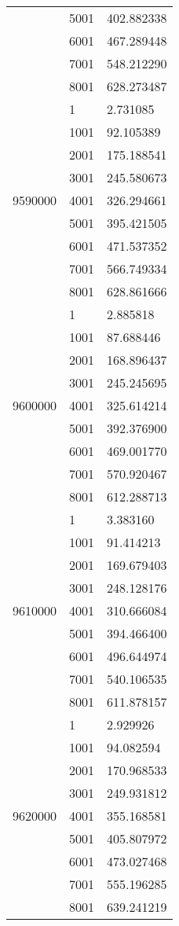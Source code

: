 \begin{table}[htb!]
\begin{tabular}{lll}
 & 5001 & 402.882338 \\
 & 6001 & 467.289448 \\
 & 7001 & 548.212290 \\
 & 8001 & 628.273487 \\
\multirow[c]{9}{*}{9590000} & 1 & 2.731085 \\
 & 1001 & 92.105389 \\
 & 2001 & 175.188541 \\
 & 3001 & 245.580673 \\
 & 4001 & 326.294661 \\
 & 5001 & 395.421505 \\
 & 6001 & 471.537352 \\
 & 7001 & 566.749334 \\
 & 8001 & 628.861666 \\
\multirow[c]{9}{*}{9600000} & 1 & 2.885818 \\
 & 1001 & 87.688446 \\
 & 2001 & 168.896437 \\
 & 3001 & 245.245695 \\
 & 4001 & 325.614214 \\
 & 5001 & 392.376900 \\
 & 6001 & 469.001770 \\
 & 7001 & 570.920467 \\
 & 8001 & 612.288713 \\
\multirow[c]{9}{*}{9610000} & 1 & 3.383160 \\
 & 1001 & 91.414213 \\
 & 2001 & 169.679403 \\
 & 3001 & 248.128176 \\
 & 4001 & 310.666084 \\
 & 5001 & 394.466400 \\
 & 6001 & 496.644974 \\
 & 7001 & 540.106535 \\
 & 8001 & 611.878157 \\
\multirow[c]{9}{*}{9620000} & 1 & 2.929926 \\
 & 1001 & 94.082594 \\
 & 2001 & 170.968533 \\
 & 3001 & 249.931812 \\
 & 4001 & 355.168581 \\
 & 5001 & 405.807972 \\
 & 6001 & 473.027468 \\
 & 7001 & 555.196285 \\
 & 8001 & 639.241219 \\

\end{tabular}
\end{table}
